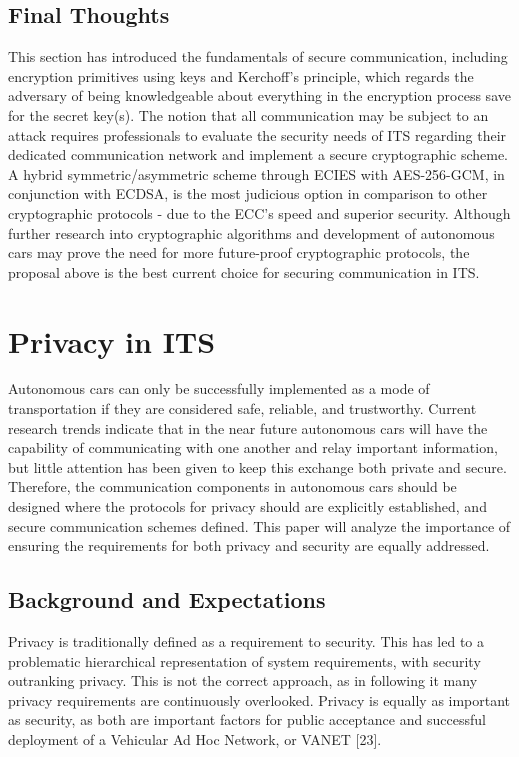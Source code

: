 \documentclass[conference,compsoc]{IEEEtran}
\begin{document}
\subsection{Final Thoughts}
This section has introduced the fundamentals of secure communication, including encryption primitives using keys and Kerchoff’s principle, which regards the adversary of being knowledgeable about everything in the encryption process save for the secret key(s). The notion that all communication may be subject to an attack requires professionals to evaluate the security needs of ITS regarding their dedicated communication network and implement a secure cryptographic scheme. A hybrid symmetric/asymmetric scheme through ECIES with AES-256-GCM, in conjunction with ECDSA, is the most judicious option in comparison to other cryptographic protocols - due to the ECC’s speed and superior security. Although further research into cryptographic algorithms and development of autonomous cars may prove the need for more future-proof cryptographic protocols, the proposal above is the best current choice for securing communication in ITS.


\section{Privacy in ITS}

Autonomous cars can only be successfully implemented as a mode of transportation if they are considered safe, reliable, and trustworthy. Current research trends indicate that in the near future autonomous cars will have the capability of communicating with one another and relay important information, but little attention has been given to keep this exchange both private and secure. Therefore, the communication components in autonomous cars should be designed where the protocols for privacy should are explicitly established, and secure communication schemes defined. This paper will analyze the importance of ensuring the requirements for both privacy and security are equally addressed. 

\subsection{Background and Expectations}
Privacy is traditionally defined as a requirement to security. This has led to a problematic hierarchical representation of system requirements, with security outranking privacy. This is not the correct approach, as in following it many privacy requirements are continuously overlooked. Privacy is equally as important as security, as both are important factors for public acceptance and successful deployment of a Vehicular Ad Hoc Network, or VANET [23].
\end{document}
